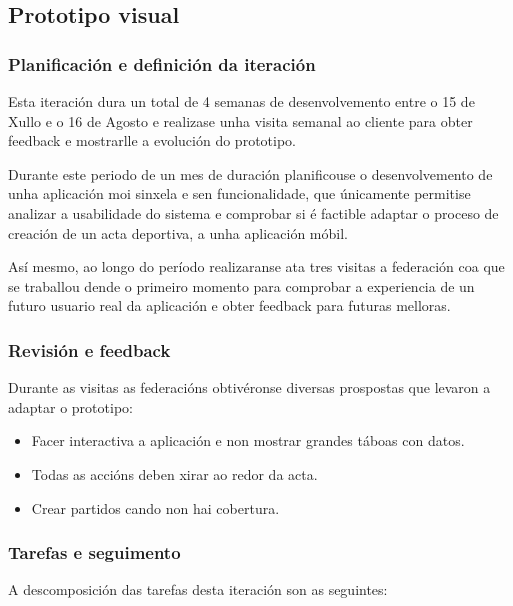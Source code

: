     \subsection{Prototipo visual}

      \subsubsection{Planificación e definición da iteración}
      Esta iteración dura un total de 4 semanas de desenvolvemento entre o 15 
de Xullo e o 16 de Agosto e realizase unha visita semanal ao cliente para obter 
feedback e mostrarlle a evolución do prototipo.

      Durante este periodo de un mes de duración planificouse o desenvolvemento 
de unha aplicación moi sinxela e sen funcionalidade, que únicamente permitise 
analizar a usabilidade do sistema e comprobar si é factible adaptar o proceso 
de creación de un acta deportiva, a unha aplicación móbil.

    Así mesmo, ao longo do período realizaranse ata tres visitas a federación 
coa que se traballou dende o primeiro momento para comprobar a experiencia de 
un futuro usuario real da aplicación e obter feedback para futuras melloras.

      \subsubsection{Revisión e feedback}
      Durante as visitas as federacións obtivéronse diversas prospostas que 
levaron a adaptar o prototipo:

      \begin{itemize}
        \item Facer interactiva a aplicación e non mostrar grandes táboas con 
datos.
        \item Todas as accións deben xirar ao redor da acta.
        \item Crear partidos cando non hai cobertura.
      \end{itemize}

      \subsubsection{Tarefas e seguimento}

      A descomposición das tarefas desta iteración son as seguintes:

